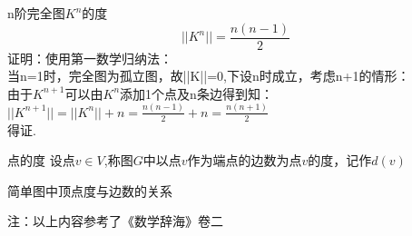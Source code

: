 \begin{theorem}{n阶完全图$K^{n}$的度}
\begin{equation}
||K^{n}||=\frac{n(n-1)}{2}
\end{equation}
证明：使用第一数学归纳法：
\\当n=1时，完全图为孤立图，故||K||=0,下设n时成立，考虑n+1的情形：
\\由于$K^{n+1}$可以由$K^{n}$添加1个点及n条边得到知：
\\ $||K^{n+1}||=||K^{n}||+n=\frac{n(n-1)}{2}+n=\frac{n(n+1)}{2}$
\\得证.
\end{theorem}
\begin{definition}{点的度}
设点$v \in V$,称图$G$中以点$v$作为端点的边数为点$v$的度，记作$d(v)$
\end{definition}
\begin{theorem}{简单图中顶点度与边数的关系}

\end{theorem}
注：以上内容参考了《数学辞海》卷二